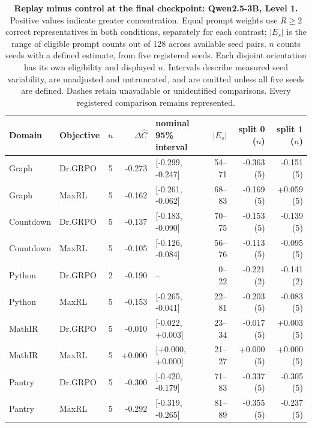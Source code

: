 \begin{table}[!htbp]
\centering
\scriptsize
\setlength{\tabcolsep}{3pt}
\begin{tabular}{@{}llcrlrrr@{}}
\toprule
Domain & Objective & $n$ & $\Delta\widehat C$ & nominal 95\% interval & $|E_s|$ & split 0 ($n$) & split 1 ($n$) \\
\midrule
Graph & Dr.GRPO & 5 & -0.273 & [-0.299, -0.247] & 54--71 & -0.363 (5) & -0.151 (5) \\
Graph & MaxRL & 5 & -0.162 & [-0.261, -0.062] & 68--83 & -0.169 (5) & +0.059 (5) \\
Countdown & Dr.GRPO & 5 & -0.137 & [-0.183, -0.090] & 70--75 & -0.153 (5) & -0.139 (5) \\
Countdown & MaxRL & 5 & -0.105 & [-0.126, -0.084] & 56--76 & -0.113 (5) & -0.095 (5) \\
Python & Dr.GRPO & 2 & -0.190 & -- & 0--22 & -0.221 (2) & -0.141 (2) \\
Python & MaxRL & 5 & -0.153 & [-0.265, -0.041] & 22--81 & -0.203 (5) & -0.083 (5) \\
MathIR & Dr.GRPO & 5 & -0.010 & [-0.022, +0.003] & 23--34 & -0.017 (5) & +0.003 (5) \\
MathIR & MaxRL & 5 & +0.000 & [+0.000, +0.000] & 21--27 & +0.000 (5) & +0.000 (5) \\
Pantry & Dr.GRPO & 5 & -0.300 & [-0.420, -0.179] & 71--83 & -0.337 (5) & -0.305 (5) \\
Pantry & MaxRL & 5 & -0.292 & [-0.319, -0.265] & 81--89 & -0.355 (5) & -0.237 (5) \\
\bottomrule
\end{tabular}
\caption{\textbf{Replay minus control at the final checkpoint: Qwen2.5-3B, Level 1.} Positive values indicate greater concentration. Equal prompt weights use $R\ge2$ correct representatives in both conditions, separately for each contrast; $|E_s|$ is the range of eligible prompt counts out of 128 across available seed pairs. $n$ counts seeds with a defined estimate, from five registered seeds. Each disjoint orientation has its own eligibility and displayed $n$. Intervals describe measured seed variability, are unadjusted and untruncated, and are omitted unless all five seeds are defined. Dashes retain unavailable or unidentified comparisons. Every registered comparison remains represented.}
\end{table}

